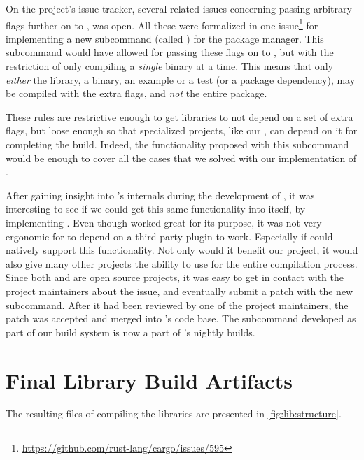 On the {\cargo} project's issue tracker, several related issues concerning passing arbitrary flags further on to {\rustc}, was open.
All these were formalized in one issue\footnote{\url{https://github.com/rust-lang/cargo/issues/595}} for implementing a new subcommand (called ) for the package manager.
This subcommand would have allowed for passing these flags on to {\rustc}, but with the restriction of only compiling a \emph{single} binary at a time.
This means that only \emph{either} the library, a binary, an example or a test (or a package dependency), may be compiled with the extra flags, and \emph{not} the entire package.

These rules are restrictive enough to get libraries to not depend on a set of extra flags, but loose enough so that specialized projects, like our , can depend on it for completing the build.
Indeed, the functionality proposed with this subcommand would be enough to cover all the cases that we solved with our implementation of .

After gaining insight into {\cargo}'s internals during the development of , it was interesting to see if we could get this same functionality into {\cargo} itself, by implementing .
Even though  worked great for its purpose, it was not very ergonomic for {\rg} to depend on a third-party plugin to work.
Especially if {\cargo} could natively support this functionality.
Not only would it benefit our project, it would also give many other {\rust} projects the ability to use {\cargo} for the entire compilation process.
Since both {\rust} and {\cargo} are open source projects, it was easy to get in contact with the project maintainers about the issue, and eventually submit a patch with the new subcommand.
After it had been reviewed by one of the project maintainers, the patch was accepted and merged into {\cargo}'s code base.
The subcommand developed as part of our build system is now a part of {\rust}'s nightly builds.

\section{Final Library Build Artifacts}

The resulting files of compiling the libraries are presented in \autoref{fig:lib:structure}.

